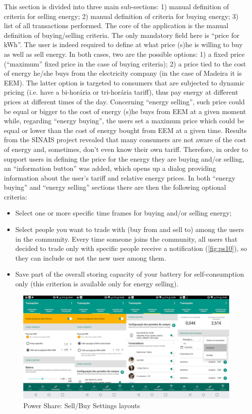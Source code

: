 This section is divided into three main sub-sections: 1) manual definition of criteria for selling energy; 2) manual definition of criteria for buying energy; 3) list of all transactions performed.
The core of the application is the manual definition of buying/selling criteria. The only mandatory field here is “price for kWh”. The user is indeed required to define at what price (s)he is willing to buy as well as sell energy. In both cases, two are the possible options: 1) a fixed price (“maximum” fixed price in the case of buying criteria); 2) a price tied to the cost of energy he/she buys from the electricity company (in the case of Madeira it is \ac{EEM}). The latter option is targeted to consumers that are subjected to dynamic pricing (i.e. have a bi-horária or tri-horária tariff), thus pay energy at different prices at different times of the day. Concerning “energy selling”, such price could be equal or bigger to the cost of energy (s)he buys from \ac{EEM} at a given moment while, regarding “energy buying”, the users set a maximum price which could be equal or lower than the cost of energy bought from \ac{EEM} at a given time. Results from the \ac{SINAIS} project revealed that many consumers are not aware of the cost of energy and, sometimes, don’t even know their own tariff. Therefore, in order to support users in defining the price for the energy they are buying and/or selling, an “information button” was added, which opens up a dialog providing information about the user’s tariff and relative energy prices. 
In both “energy buying” and “energy selling” sections there are then the following optional criteria:
\begin{itemize}
    \item Select one or more specific time frames for buying and/or selling energy;
    \item Select people you want to trade with (buy from and sell to) among the users in the community. Every time someone joins the community, all users that decided to trade only with specific people receive a notification (\cref{fig:ps10}), so they can include or not the new user among them. 
    \item Save part of the overall storing capacity of your battery for self-consumption only (this criterion is available only for energy selling). 
\end{itemize}


\begin{figure}[h]
\centering
\includegraphics[width=1\textwidth]{./Images/ps9}
\caption{Power Share: Sell/Buy Settings layouts}
\label{fig:ps9}
\end{figure}

